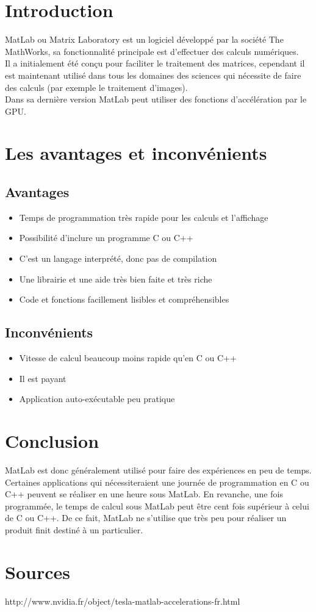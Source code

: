 \section{Introduction}
MatLab ou Matrix Laboratory est un logiciel développé par la société The MathWorks, sa fonctionnalité principale est d'effectuer des calculs numériques.\\ 
Il a initialement été conçu pour faciliter le traitement des matrices, cependant il est maintenant utilisé dans tous les domaines des sciences qui nécessite de faire des calculs (par exemple le traitement d'images).\\
Dans sa dernière version MatLab peut utiliser des fonctions d'accélération par le GPU.\\


\section{Les avantages et inconvénients}
\subsection{Avantages}
\begin{itemize}
\item Temps de programmation très rapide pour les calculs et l'affichage
\item Possibilité d'inclure un programme C ou C++
\item C'est un langage interprété, donc pas de compilation
\item Une librairie et une aide très bien faite et très riche
\item Code et fonctions facillement lisibles et compréhensibles
\end{itemize}

\subsection{Inconvénients}
\begin{itemize}
\item Vitesse de calcul beaucoup moins rapide qu'en C ou C++
\item Il est payant
\item Application auto-exécutable peu pratique
\end{itemize}

\section{Conclusion}
MatLab est donc généralement utilisé pour faire des expériences en peu de temps. Certaines applications qui nécessiteraient une journée de programmation en C ou C++ peuvent se réaliser en une heure sous MatLab. En revanche, une fois programmée, le temps de calcul sous MatLab peut être cent fois supérieur à celui de C ou C++. De ce fait, MatLab ne s'utilise que très peu pour réaliser un produit finit destiné à un particulier. 

\section{Sources}
http://www.nvidia.fr/object/tesla-matlab-accelerations-fr.html
